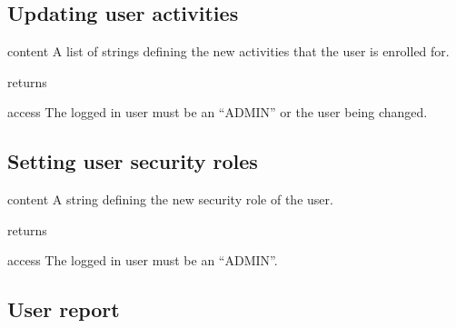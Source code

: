 \subsection{Updating user activities}

\begin{apidata}{content}
  A list of strings defining the new activities that the user is enrolled for.
\end{apidata}
\begin{apidata}{returns}
  \begin{datalist}
  \end{datalist}
\end{apidata}
\begin{apidata}{access}
The logged in user must be an ``ADMIN'' or the user being changed.
\end{apidata}


\subsection{Setting user security roles}
\begin{apidata}{content}
  A string defining the new security role of the user. 
\end{apidata}
\begin{apidata}{returns}
  \begin{datalist}
  \end{datalist}
\end{apidata}
\begin{apidata}{access}
The logged in user must be an ``ADMIN''.
\end{apidata}

\subsection{User report}

